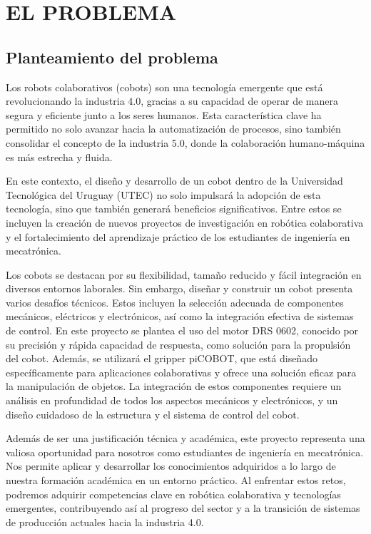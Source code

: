 
\chapter{EL PROBLEMA}

\section{Planteamiento del problema}

Los robots colaborativos (cobots) son una tecnología emergente que está revolucionando la industria 4.0, gracias a su capacidad de operar de manera segura y eficiente junto a los seres humanos. Esta característica clave ha permitido no solo avanzar hacia la automatización de procesos, sino también consolidar el concepto de la industria 5.0, donde la colaboración humano-máquina es más estrecha y fluida.

En este contexto, el diseño y desarrollo de un cobot dentro de la Universidad Tecnológica del Uruguay (UTEC) no solo impulsará la adopción de esta tecnología, sino que también generará beneficios significativos. Entre estos se incluyen la creación de nuevos proyectos de investigación en robótica colaborativa y el fortalecimiento del aprendizaje práctico de los estudiantes de ingeniería en mecatrónica.

Los cobots se destacan por su flexibilidad, tamaño reducido y fácil integración en diversos entornos laborales. Sin embargo, diseñar y construir un cobot presenta varios desafíos técnicos. Estos incluyen la selección adecuada de componentes mecánicos, eléctricos y electrónicos, así como la integración efectiva de sistemas de control. En este proyecto se plantea el uso del motor DRS 0602, conocido por su precisión y rápida capacidad de respuesta, como solución para la propulsión del cobot. Además, se utilizará el gripper piCOBOT, que está diseñado específicamente para aplicaciones colaborativas y ofrece una solución eficaz para la manipulación de objetos. La integración de estos componentes requiere un análisis en profundidad de todos los aspectos mecánicos y electrónicos, y un diseño cuidadoso de la estructura y el sistema de control del cobot.

Además de ser una justificación técnica y académica, este proyecto representa una valiosa oportunidad para nosotros como estudiantes de ingeniería en mecatrónica. Nos permite aplicar y desarrollar los conocimientos adquiridos a lo largo de nuestra formación académica en un entorno práctico. Al enfrentar estos retos, podremos adquirir competencias clave en robótica colaborativa y tecnologías emergentes, contribuyendo así al progreso del sector y a la transición de sistemas de producción actuales hacia la industria 4.0.

